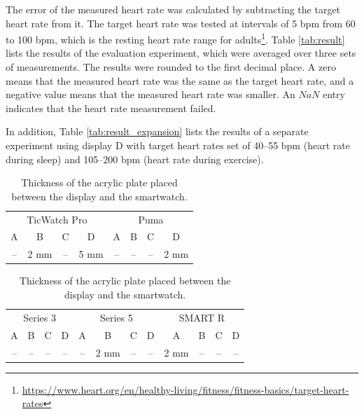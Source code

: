 The error of the measured heart rate was calculated by subtracting the target heart rate from it. The target heart rate was tested at intervals of 5 bpm from 60 to 100 bpm, which is the resting heart rate range for adults\footnote{\url{https://www.heart.org/en/healthy-living/fitness/fitness-basics/target-heart-rates}}. Table \ref{tab:result} lists the results of the evaluation experiment, which were averaged over three sets of measurements. The results were rounded to the first decimal place. A zero means that the measured heart rate was the same as the target heart rate, and a negative value means that the measured heart rate was smaller. An $NaN$ entry indicates that the heart rate measurement failed.\par

In addition, Table \ref{tab:result_expansion} lists the results of a separate experiment using display D with target heart rates set of 40--55 bpm (heart rate during sleep) and 105--200 bpm (heart rate during exercise).

\begin{table}[!t]
  \centering
  \caption{Thickness of the acrylic plate placed between the display and the smartwatch.}
  \begin{tabular}{cccc|cccc}
    \toprule
    \multicolumn{4}{c|}{TicWatch Pro}&\multicolumn{4}{c}{Puma} \\
    A & B & C & D & A & B & C & D \\
    \midrule
    -- & 2 mm & -- & 5 mm & -- & -- & -- & 2 mm \\
    \bottomrule
  \end{tabular}
  \begin{tabular}{cccc|cccc|cccc}
    \toprule
    \multicolumn{4}{c|}{Series 3}&\multicolumn{4}{c|}{Series 5}&\multicolumn{4}{c}{SMART R} \\
    A & B & C & D & A & B & C & D & A & B & C & D \\
    \midrule
    -- & -- & -- & -- & -- & 2 mm & -- & -- & 2 mm & -- & -- & -- \\
    \bottomrule
  \end{tabular}
  \label{tab:acrylic_plate}
\end{table}

